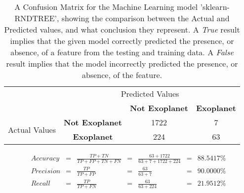 
    \renewcommand{\arraystretch}{2}
    \renewcommand{\tabcolsep}{20.25pt}
    \begin{table}[ht]
    \begin{tabular}{cccc}
     & \multicolumn{3}{c}{Predicted Values} \\ \cline{3-4}
     & \multicolumn{1}{c|}{} & \multicolumn{1}{c|}{\textbf{Not Exoplanet}} & \multicolumn{1}{c|}{\textbf{Exoplanet}} \\ \cline{2-4}
    \multicolumn{1}{c|}{\multirow{2}{2.0cm}{Actual Values}} & \multicolumn{1}{c|}{\textbf{Not Exoplanet}} & \multicolumn{1}{c|}{1722} & \multicolumn{1}{c|}{7} \\ \cline{2-4}
    \multicolumn{1}{c|}{} & \multicolumn{1}{c|}{\textbf{Exoplanet}} & \multicolumn{1}{c|}{224} & \multicolumn{1}{c|}{63} \\ \cline{2-4}
    \end{tabular}
    \caption{A Confusion Matrix for the Machine Learning model 'sklearn-RNDTREE', showing the comparison between the Actual and Predicted values, and what conclusion they represent. A \emph{True} result implies that the given model correctly predicted the presence, or absence, of a feature from the testing and training data. A \emph{False} result implies that the model incorrectly predicted the presence, or absence, of the feature.}
    \label{tab:sklearn-RNDTREEconfusionmatrix}
    \end{table}

    \label{eq:precisionsklearn-RNDTREE}
    \begin{align*}
        Accuracy &= &\frac{TP + TN}{TP + FP + TN + FN} &= &\frac{63 + 1722}{63 + 7 + 1722 + 224} &= & 88.5417\% \\
        Precision &= &\frac{TP}{TP + FP} &= &\frac{63}{63 + 7} &= & 90.0000\% \\
        Recall &= &\frac{TP}{TP + FN} &= &\frac{63}{63 + 224} &= & 21.9512\% \\
    \end{align*}

    \renewcommand{\arraystretch}{1}
    \renewcommand{\tabcolsep}{5.25pt}
    